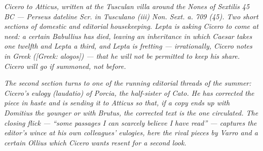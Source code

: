 
\textit{Cicero to Atticus, written at the Tusculan villa around the
Nones of Sextilis 45 BC --- Perseus dateline \textit{Scr. in
Tusculano (iii) Non. Sext. a. 709 (45)}. Two short sections of
domestic and editorial housekeeping. Lepta is asking Cicero to
come at need: a certain Babullius has died, leaving an inheritance
in which Caesar takes one twelfth and Lepta a third, and Lepta is
fretting --- irrationally, Cicero notes in Greek
(\textit{[Greek: alogos]}) --- that he will not be permitted to
keep his share. Cicero will go if summoned, not before.}

\textit{The second section turns to one of the running editorial
threads of the summer: Cicero's eulogy (\textit{laudatio}) of
Porcia, the half-sister of Cato. He has corrected the piece in
haste and is sending it to Atticus so that, if a copy ends up
with Domitius the younger or with Brutus, the corrected text is
the one circulated. The closing flick --- ``some passages I can
scarcely believe I have read'' --- captures the editor's wince
at his own colleagues' eulogies, here the rival pieces by Varro
and a certain Ollius which Cicero wants resent for a second
look.}
